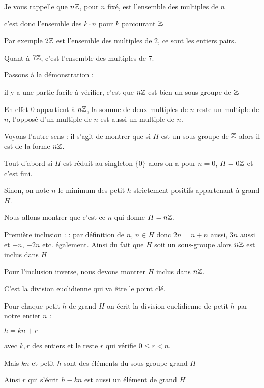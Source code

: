 \change

Je vous rappelle que $n\mathbb{Z}$, pour $n$ fixé, est l'ensemble des multiples de $n$ 

c'est donc l'ensemble des $k\cdot n$ pour $k$ parcourant $\mathbb{Z}$

\change

Par exemple $2\mathbb{Z}$ est l'ensemble des multiples de $2$, ce sont les entiers pairs.

\change

Quant à $7\mathbb{Z}$, c'est l'ensemble des multiples de $7$.

\change

Passons à la démonstration :

il y a une partie facile à vérifier, c'est que $n\mathbb{Z}$ est bien un sous-groupe
de $\mathbb{Z}$

En effet $0$ appartient à $n\mathbb{Z}$, la somme de deux multiples de $n$ reste un multiple de $n$,
l'opposé d'un multiple de $n$ est aussi un multiple de $n$.

\change

Voyons l'autre sens : il s'agit de montrer que si $H$ est un sous-groupe de $\mathbb{Z}$
alors il est de la forme $n\mathbb{Z}$.

Tout d'abord si $H$ est réduit au singleton $\{0\}$ alors on a pour $n=0$, $H = 0\mathbb{Z}$
et c'est fini.

Sinon, on note $n$ le minimum des petit $h$ strictement positifs appartenant à grand $H$.

Nous allons montrer que c'est ce $n$ qui donne $H=n\mathbb{Z}$.

\change

Première inclusion : : par définition de $n$, $n\in H$ donc $2n=n+n$ aussi, $3n$ aussi
et $-n$, $-2n$ etc. également. Ainsi du fait que $H$ soit un sous-groupe alors $n\mathbb{Z}$
est inclus dans $H$

\change

Pour l'inclusion inverse, nous devons montrer $H$ inclus dans $n\mathbb{Z}$.

C'est la division euclidienne qui va être le point clé.

Pour chaque petit $h$ de grand $H$ on écrit la division euclidienne de petit $h$
par notre entier $n$ : 

$h = kn+r$

avec $k,r$ des entiers et le reste $r$ qui vérifie $0\le r < n$.

Mais $kn$ et petit $h$ sont des éléments du sous-groupe grand $H$

Ainsi $r$ qui s'écrit $h-kn$ est aussi un élément de grand $H$

